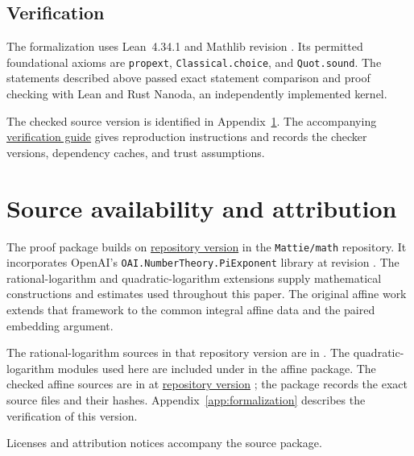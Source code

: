 \documentclass[11pt]{article}
\theoremstyle{definition}
\theoremstyle{remark}
\theoremstyle{plain}
\begin{document}
\subsection{Verification}
The formalization uses Lean~4.34.1 and Mathlib revision
. Its permitted
foundational axioms are \texttt{propext}, \texttt{Classical.choice},
and \texttt{Quot.sound}. The statements described above passed exact
statement comparison and proof checking with
Lean and Rust Nanoda, an independently implemented kernel.

The checked source version is identified in Appendix~\ref{app:attribution}.
The accompanying
\href{https://github.com/Mattie/math/blob/51c9a62e1f8dde60f75201c14b35b42abb04eb2a/formalizations/AffineLogarithms/VERIFY.md}{verification guide}
gives reproduction instructions and records the checker versions,
dependency caches, and trust assumptions.

\section{Source availability and attribution}\label{app:attribution}
The proof package builds on
\href{https://github.com/Mattie/math/tree/0cfe10002ea95c45721b93d18bffbe2c3bbbcbbd}{repository version}
 in the
\texttt{Mattie/math} repository. It incorporates OpenAI's
\texttt{OAI.NumberTheory.PiExponent} library at revision
. The rational-logarithm
and quadratic-logarithm extensions supply mathematical constructions and
estimates used throughout this paper. The original affine work extends
that framework to the common integral affine data and the paired
embedding argument.

The rational-logarithm sources in that repository version are in
.
The quadratic-logarithm modules used here are included under
 in the affine package. The checked affine sources
are in  at
\href{https://github.com/Mattie/math/tree/b15a6431eca8632a48c1cd84e5200edd30f0670c}{repository version}
; the package records
the exact source files and their hashes. Appendix~\ref{app:formalization}
describes the verification of this version.

Licenses and attribution notices accompany the source package.
\end{document}
